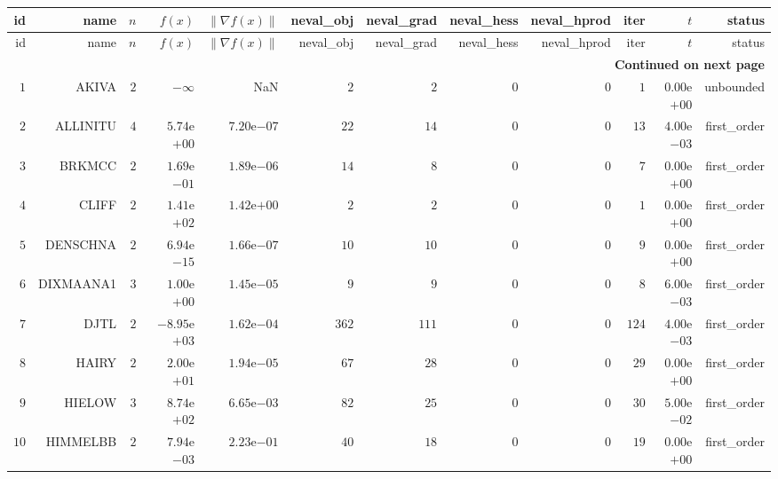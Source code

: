 \begin{longtable}{rrrrrrrrrrrr}
  \hline
  id & name & \(n\) & \(f(x)\) & \(\|\nabla f(x)\|\) & neval\_obj & neval\_grad & neval\_hess & neval\_hprod & iter & \(t\) & status \\\hline
  \endfirsthead
  \hline
  id & name & \(n\) & \(f(x)\) & \(\|\nabla f(x)\|\) & neval\_obj & neval\_grad & neval\_hess & neval\_hprod & iter & \(t\) & status \\\hline
  \endhead
  \hline
  \multicolumn{12}{r}{{\bfseries Continued on next page}}\\
  \hline
  \endfoot
  \endlastfoot
  \(     1\) & AKIVA & \(     2\) & \(-\infty\) &       NaN & \(     2\) & \(     2\) & \(     0\) & \(     0\) & \(     1\) & \( 0.00\)e\(+00\) & unbounded \\
  \(     2\) & ALLINITU & \(     4\) & \( 5.74\)e\(+00\) & \( 7.20\)e\(-07\) & \(    22\) & \(    14\) & \(     0\) & \(     0\) & \(    13\) & \( 4.00\)e\(-03\) & first\_order \\
  \(     3\) & BRKMCC & \(     2\) & \( 1.69\)e\(-01\) & \( 1.89\)e\(-06\) & \(    14\) & \(     8\) & \(     0\) & \(     0\) & \(     7\) & \( 0.00\)e\(+00\) & first\_order \\
  \(     4\) & CLIFF & \(     2\) & \( 1.41\)e\(+02\) & \( 1.42\)e\(+00\) & \(     2\) & \(     2\) & \(     0\) & \(     0\) & \(     1\) & \( 0.00\)e\(+00\) & first\_order \\
  \(     5\) & DENSCHNA & \(     2\) & \( 6.94\)e\(-15\) & \( 1.66\)e\(-07\) & \(    10\) & \(    10\) & \(     0\) & \(     0\) & \(     9\) & \( 0.00\)e\(+00\) & first\_order \\
  \(     6\) & DIXMAANA1 & \(     3\) & \( 1.00\)e\(+00\) & \( 1.45\)e\(-05\) & \(     9\) & \(     9\) & \(     0\) & \(     0\) & \(     8\) & \( 6.00\)e\(-03\) & first\_order \\
  \(     7\) & DJTL & \(     2\) & \(-8.95\)e\(+03\) & \( 1.62\)e\(-04\) & \(   362\) & \(   111\) & \(     0\) & \(     0\) & \(   124\) & \( 4.00\)e\(-03\) & first\_order \\
  \(     8\) & HAIRY & \(     2\) & \( 2.00\)e\(+01\) & \( 1.94\)e\(-05\) & \(    67\) & \(    28\) & \(     0\) & \(     0\) & \(    29\) & \( 0.00\)e\(+00\) & first\_order \\
  \(     9\) & HIELOW & \(     3\) & \( 8.74\)e\(+02\) & \( 6.65\)e\(-03\) & \(    82\) & \(    25\) & \(     0\) & \(     0\) & \(    30\) & \( 5.00\)e\(-02\) & first\_order \\
  \(    10\) & HIMMELBB & \(     2\) & \( 7.94\)e\(-03\) & \( 2.23\)e\(-01\) & \(    40\) & \(    18\) & \(     0\) & \(     0\) & \(    19\) & \( 0.00\)e\(+00\) & first\_order \\

\end{longtable}
